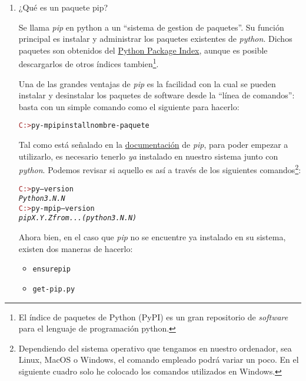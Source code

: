 \documentclass{article}
\begin{document}
\begin{enumerate}
\item ¿Qué es un paquete pip?
\par \hspace{5pt} Se llama \emph{pip} en python a un ``sistema de gestion de paquetes''. Su función principal es instalar y administrar los paquetes existentes de \emph{python}. Dichos paquetes son obtenidos del \href{https://pypi.org/}{Python Package Index}, aunque es posible descargarlos de otros índices tambien\footnote{El índice de paquetes de Python (PyPI) es un gran repositorio de \emph{software} para el lenguaje de programación python.}.
\par \hspace{5pt} Una de las grandes ventajas de \emph{pip} es la facilidad con la cual se pueden instalar y desinstalar los paquetes de software desde la ``línea de comandos'': basta con un simple comando como el siguiente para hacerlo:
\begin{tcolorbox}
\begin{alltt}
\textcolor{brown}{C:>} py -m pip install nombre-paquete 
\end{alltt}
\end{tcolorbox}
\par \hspace{5pt} Tal como está señalado en la \href{https://pip.pypa.io/en/stable/}{documentación} de \emph{pip}, para poder empezar a utilizarlo, es necesario tenerlo \emph{ya} instalado en nuestro sistema junto con \emph{python}. Podemos revisar si aquello es así a través de los siguientes comandos\footnote{Dependiendo del sistema operativo que tengamos en nuestro ordenador, sea Linux, MacOS o Windows, el comando empleado podrá variar un poco. En el siguiente cuadro  solo he colocado los comandos utilizados en Windows.}:  
 \begin{tcolorbox}
    \begin{alltt}
      \textcolor{brown}{C:>} py --version
      \emph{Python 3.N.N}
      \textcolor{brown}{C:>} py -m pip --version
      \emph{pip X.Y.Z from ... (python 3.N.N)}
    \end{alltt}        
  \end{tcolorbox}

  \par \hspace{5pt} Ahora bien, en el caso que \emph{pip} no se encuentre ya instalado en su sistema, existen dos maneras de hacerlo:

  \begin{itemize}
  \item
    \begin{alltt}
      ensurepip
    \end{alltt}
  \item
    \begin{alltt}
      get-pip.py
    \end{alltt} 
  \end{itemize}


\end{enumerate}
\end{document}
